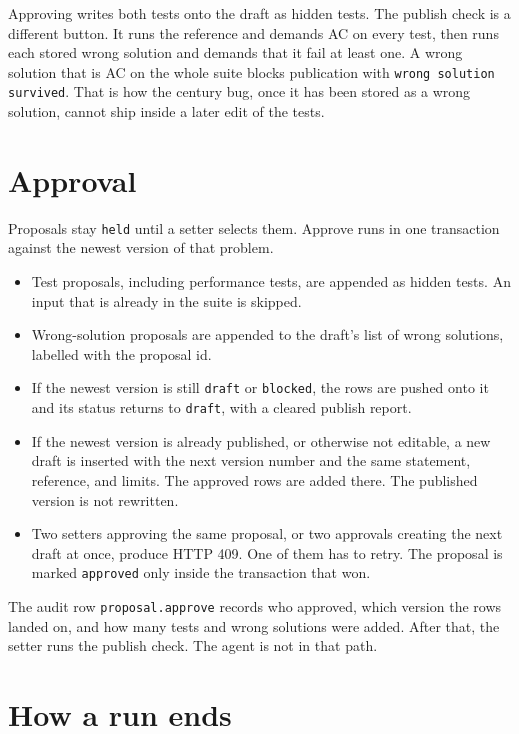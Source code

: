 \documentclass[10pt,a4paper]{article}
\begin{document}
Approving writes both tests onto the draft as hidden tests. The publish check is a different button. It runs the reference and demands AC on every test, then runs each stored wrong solution and demands that it fail at least one. A wrong solution that is AC on the whole suite blocks publication with \texttt{wrong solution survived}. That is how the century bug, once it has been stored as a wrong solution, cannot ship inside a later edit of the tests.

\section{Approval}

Proposals stay \texttt{held} until a setter selects them. Approve runs in one transaction against the newest version of that problem.

\begin{itemize}
  \item Test proposals, including performance tests, are appended as hidden tests. An input that is already in the suite is skipped.
  \item Wrong-solution proposals are appended to the draft's list of wrong solutions, labelled with the proposal id.
  \item If the newest version is still \texttt{draft} or \texttt{blocked}, the rows are pushed onto it and its status returns to \texttt{draft}, with a cleared publish report.
  \item If the newest version is already published, or otherwise not editable, a new draft is inserted with the next version number and the same statement, reference, and limits. The approved rows are added there. The published version is not rewritten.
  \item Two setters approving the same proposal, or two approvals creating the next draft at once, produce HTTP 409. One of them has to retry. The proposal is marked \texttt{approved} only inside the transaction that won.
\end{itemize}

The audit row \texttt{proposal.approve} records who approved, which version the rows landed on, and how many tests and wrong solutions were added. After that, the setter runs the publish check. The agent is not in that path.

\section{How a run ends}
\end{document}
